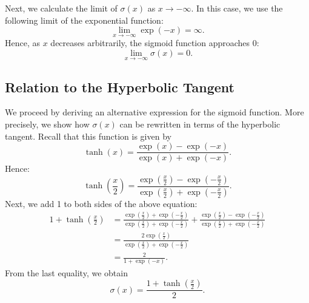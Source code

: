 \documentclass[10pt,american]{scrartcl}
\begin{document}
Next, we calculate the limit of $\sigma\left(x\right)$ as
$x\rightarrow-\infty$. In this case, we use the following limit of the
exponential function:
\begin{equation*}
\lim_{x\rightarrow-\infty}\exp\left(-x\right)=\infty.
\end{equation*}
Hence, as $x$ decreases arbitrarily, the sigmoid function approaches 0:
\begin{equation}
\lim_{x\rightarrow-\infty}\sigma\left(x\right)=0.
\end{equation}

\subsection*{Relation to the Hyperbolic Tangent}

We proceed by deriving an alternative expression for the sigmoid function.
More precisely, we show how $\sigma\left(x\right)$ can be rewritten in terms of
the hyperbolic tangent. Recall that this function is given by
\begin{equation*}
\tanh\left(x\right)=\frac{\exp\left(x\right)-\exp\left(-x\right)}{\exp\left(x\right)+\exp\left(-x\right)}.
\end{equation*}
Hence:
\begin{equation*}
\tanh\left(\frac{x}{2}\right)=\frac{\exp\left(\frac{x}{2}\right)-\exp\left(-\frac{x}{2}\right)}{\exp\left(\frac{x}{2}\right)+\exp\left(-\frac{x}{2}\right)}.
\end{equation*}
Next, we add 1 to both sides of the above equation:
\begin{align*}
1+\tanh\left(\frac{x}{2}\right)&=\frac{\exp\left(\frac{x}{2}\right)+\exp\left(-\frac{x}{2}\right)}{\exp\left(\frac{x}{2}\right)+\exp\left(-\frac{x}{2}\right)}+\frac{\exp\left(\frac{x}{2}\right)-\exp\left(-\frac{x}{2}\right)}{\exp\left(\frac{x}{2}\right)+\exp\left(-\frac{x}{2}\right)}\\
&=\frac{2\exp\left(\frac{x}{2}\right)}{\exp\left(\frac{x}{2}\right)+\exp\left(-\frac{x}{2}\right)}\\
&=\frac{2}{1+\exp\left(-x\right)}.
\end{align*}
From the last equality, we obtain
\begin{equation}
\sigma\left(x\right)=\frac{1+\tanh\left(\frac{x}{2}\right)}{2}.
\label{eq:sigma_tanh}
\end{equation}
\end{document}
